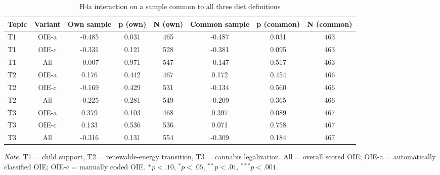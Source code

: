\begin{table}[htbp]
\centering
\begin{threeparttable}
\caption{H4a interaction on a sample common to all three diet definitions}
\label{tab:tab_h4a_common_sample}
\begin{tabular}{lccccccc}
\toprule
  Topic & Variant & Own sample & p (own) & N (own) & Common sample & p (common) & N (common) \\
\midrule
  T1 & OIE-a & -0.485 & 0.031 & 465 & -0.487 & 0.031 & 463 \\
  T1 & OIE-c & -0.331 & 0.121 & 528 & -0.381 & 0.095 & 463 \\
  T1 & All & -0.007 & 0.971 & 547 & -0.147 & 0.517 & 463 \\
  T2 & OIE-a & 0.176 & 0.442 & 467 & 0.172 & 0.454 & 466 \\
  T2 & OIE-c & -0.169 & 0.429 & 531 & -0.134 & 0.560 & 466 \\
  T2 & All & -0.225 & 0.281 & 549 & -0.209 & 0.365 & 466 \\
  T3 & OIE-a & 0.379 & 0.103 & 468 & 0.397 & 0.089 & 467 \\
  T3 & OIE-c & 0.133 & 0.536 & 536 & 0.071 & 0.758 & 467 \\
  T3 & All & -0.316 & 0.131 & 554 & -0.309 & 0.184 & 467 \\
\bottomrule
\end{tabular}
\begin{tablenotes}\footnotesize\item \textit{Note.} T1 = child support, T2 = renewable-energy transition, T3 = cannabis legalization. All = overall scored OIE; OIE-a = automatically classified OIE; OIE-c = manually coded OIE. $^{+}p<.10$, $^{*}p<.05$, $^{**}p<.01$, $^{***}p<.001$.\end{tablenotes}
\end{threeparttable}
\end{table}
